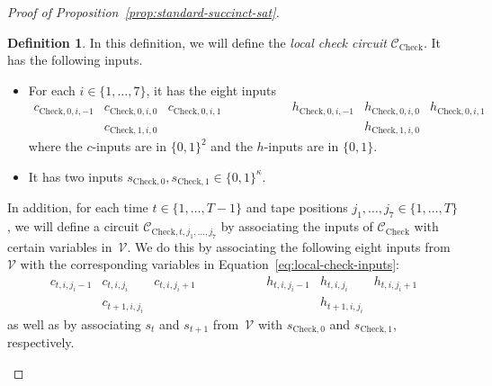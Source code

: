 \documentclass[11pt]{article}
\theoremstyle{definition}
\newtheorem{definition}[theorem]{Definition}
\newcommand{\circuit}{\mathcal{C}}
\begin{document}
\begin{proof}[Proof of Proposition~\ref{prop:standard-succinct-sat}]
  \begin{definition}\label{def:local-check-circuit}
    In this definition, we will define the \emph{local check circuit}
    $\circuit_{\mathrm{Check}}$.
    It has the following inputs.
    \begin{itemize}
    \item For each $i \in \{1, \ldots, 7\}$, it has the eight inputs
      \begin{equation}
        \label{eq:local-check-inputs}
        \begin{matrix}
          c_{\mathrm{Check}, 0, i, -1} & c_{\mathrm{Check}, 0, i, 0} &
          c_{\mathrm{Check}, 0, i, 1} & \qquad\qquad &
          h_{\mathrm{Check}, 0, i, -1} & h_{\mathrm{Check}, 0, i, 0} &
          h_{\mathrm{Check}, 0, i, 1} \\
          & c_{\mathrm{Check}, 1, i, 0} & & & &
          h_{\mathrm{Check}, 1, i, 0} &
        \end{matrix}
      \end{equation}
      where the $c$-inputs are in $\{0, 1\}^2$ and the $h$-inputs are in $\{0,
      1\}$.
    \item It has two inputs $s_{\mathrm{Check}, 0}, s_{\mathrm{Check}, 1} \in \{0, 1\}^\kappa$.
    \end{itemize}
    In addition, for each time $t \in \{1, \ldots, T-1\}$ and tape positions
    $j_1, \ldots, j_7 \in \{1, \ldots, T\}$, we will define a circuit
    $\circuit_{\mathrm{Check}, t, j_1, \ldots, j_7}$ by associating the inputs
    of $\circuit_{\mathrm{Check}}$ with certain variables in~$\mathcal{V}$.
    We do this by associating the following eight inputs from~$\mathcal{V}$ with
    the corresponding variables in Equation~\eqref{eq:local-check-inputs}:
    \begin{equation*}
      \begin{matrix}
        c_{t, i, j_i-1} & c_{t, i, j_i} & c_{t, i, j_i+1} & \qquad\qquad &
        h_{t, i, j_i-1} & h_{t, i, j_i} & h_{t, i, j_i+1} \\
        & c_{t+1, i, j_i} & & & & h_{t+1, i, j_i} &
      \end{matrix}
    \end{equation*}
    as well as by associating $s_t$ and $s_{t+1}$ from~$\mathcal{V}$ with
    $s_{\mathrm{Check}, 0}$ and $s_{\mathrm{Check},1}$, respectively.


\end{definition}
\end{proof}
\end{document}

